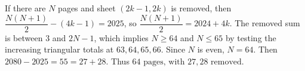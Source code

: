 If there are $N$ pages and sheet $(2k-1,2k)$ is removed, then $\dfrac{N(N+1)}{2}-(4k-1)=2025$, so $\dfrac{N(N+1)}{2}=2024+4k$. The removed sum is between $3$ and $2N-1$, which implies $N\ge64$ and $N\le65$ by testing the increasing triangular totals at $63,64,65,66$. Since $N$ is even, $N=64$. Then $2080-2025=55=27+28$. Thus $\boxed{64\text{ pages, with }27,28\text{ removed}}$.
